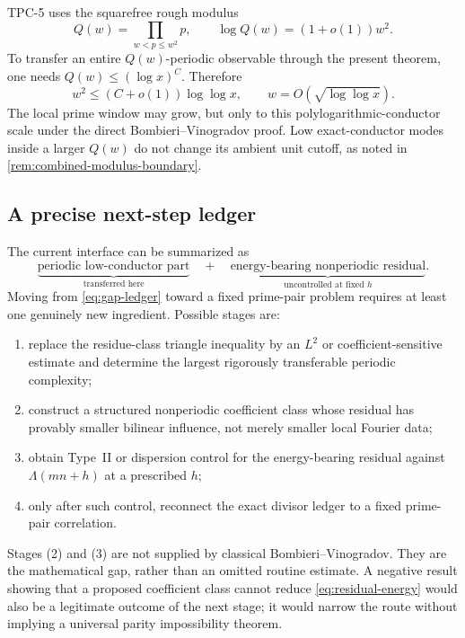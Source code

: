 TPC-5 uses the squarefree rough modulus
\begin{equation}\label{eq:TPC5-Qw}
 Q(w)=\prod_{w<p\leq w^2}p,
 \qquad
 \log Q(w)=(1+o(1))w^2.
\end{equation}
To transfer an entire $Q(w)$-periodic observable through the present theorem,
one needs $Q(w)\leq(\log x)^C$.  Therefore
\begin{equation}\label{eq:w-polylog-scale}
 w^2\leq(C+o(1))\log\log x,
 \qquad
 w=O(\sqrt{\log\log x}).
\end{equation}
The local prime window may grow, but only to this polylogarithmic-conductor
scale under the direct Bombieri--Vinogradov proof.  Low exact-conductor
modes inside a larger $Q(w)$ do not change its ambient unit cutoff, as noted
in \cref{rem:combined-modulus-boundary}.

\subsection{A precise next-step ledger}

The current interface can be summarized as
\begin{equation}\label{eq:gap-ledger}
 \underbrace{\text{periodic low-conductor part}}_{\text{transferred here}}
 \quad+\quad
 \underbrace{\text{energy-bearing nonperiodic residual}}_{\text{uncontrolled at fixed }h}.
\end{equation}
Moving from \eqref{eq:gap-ledger} toward a fixed prime-pair problem requires
at least one genuinely new ingredient.  Possible stages are:

\begin{enumerate}[label=\textup{(\arabic*)}]
 \item replace the residue-class triangle inequality by an $L^2$ or
 coefficient-sensitive estimate and determine the largest rigorously
 transferable periodic complexity;
 \item construct a structured nonperiodic coefficient class whose residual
 has provably smaller bilinear influence, not merely smaller local Fourier
 data;
 \item obtain Type~II or dispersion control for the energy-bearing residual
 against $\Lambda(mn+h)$ at a prescribed $h$;
 \item only after such control, reconnect the exact divisor ledger to a
 fixed prime-pair correlation.
\end{enumerate}

Stages (2) and (3) are not supplied by classical Bombieri--Vinogradov.  They
are the mathematical gap, rather than an omitted routine estimate.  A
negative result showing that a proposed coefficient class cannot reduce
\eqref{eq:residual-energy} would also be a legitimate outcome of the next
stage; it would narrow the route without implying a universal parity
impossibility theorem.
